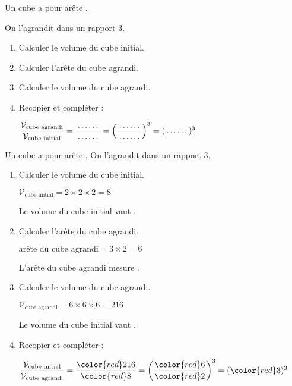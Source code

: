 \begin{exercice*}
    Un cube a pour arête .
    
    On l'agrandit dans un rapport $3$.
    \begin{enumerate}
        \item Calculer le volume du cube initial.
        \item Calculer l'arête du cube agrandi.
        \item Calculer le volume du cube agrandi.
        \item Recopier et compléter :
        
        \smallskip
        $\dfrac{\mathcal{V}_{\text{cube agrandi}}}{\mathcal{V}_{\text{cube initial}}}=\dfrac{\makebox[1cm]{\dotfill}}{\makebox[1cm]{\dotfill}}=\left(\dfrac{\makebox[1cm]{\dotfill}}{\makebox[1cm]{\dotfill}}\right)^3=(\makebox[1cm]{\dotfill})^3$
    \end{enumerate}
\end{exercice*}
\begin{corrige}
    \phantom{rrr} 
    
    \begin{multicols}{2}
        Un cube a pour arête . On l'agrandit dans un rapport $3$.

        \begin{enumerate}
            \item Calculer le volume du cube initial.
            
            {\color{red}$\mathcal{V}_{\text{cube initial}}=2\times 2\times 2 = 8$
            
            Le volume du cube initial vaut .
            }
            \item Calculer l'arête du cube agrandi.        
            
            {\color{red} $\text{arête du cube agrandi} = 3\times 2 = 6$
            
            L'arête du cube agrandi mesure .
            }
            \columnbreak
            \item Calculer le volume du cube agrandi.
            
            {\color{red}$\mathcal{V}_{\text{cube agrandi}}=6\times 6\times 6 = 216$
            
            Le volume du cube initial vaut .
            }
            \item Recopier et compléter :
            
            \smallskip
            $\dfrac{\mathcal{V}_{\text{cube initial}}}{\mathcal{V}_{\text{cube agrandi}}}=\dfrac{{\color{red}216}}{{\color{red}8}}=\left(\dfrac{{\color{red}6}}{{\color{red}2}}\right)^3=({\color{red}3})^3$
        \end{enumerate}
    \end{multicols}
\end{corrige}